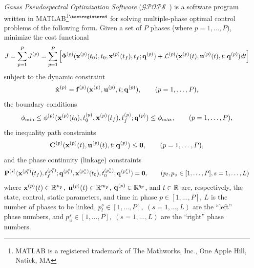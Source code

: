 \documentclass[10pt,final]{report}
\newcommand{\gpops}{$\mathcal{GPOPS}$~}
\begin{document}
{\em Gauss Pseudospectral Optimization Software}
(\gpops) is a software program written in MATLAB\footnote{MATLAB is a
  registered trademark of The Mathworks, Inc., One Apple Hill, Natick,
  MA}${}^{\textregistered}$ for solving multiple-phase optimal control
problems of the following form.  Given a set of $P$ phases (where
$p=1,\ldots,P$), minimize the cost functional
\begin{equation}
  J = \sum_{p=1}^{P} J^{(p)} = \sum_{p=1}^{P}
  \left[\Phi^{(p)}(\bfx^{(p)}(t_0),t_0,\bfx^{(p)}(t_f),t_f;\bfq^{(p)})
  + \mcL^{(p)}(\bfx^{(p)}(t),\bfu^{(p)}(t),t;\bfq^{(p)})dt \right]
\end{equation}
subject to the dynamic constraint
\begin{equation}
  \dbfx^{(p)} = \bff^{(p)}(\bfx^{(p)},\bfu^{(p)},t;\bfq^{(p)}), \qquad (p=1,\ldots,P),
\end{equation}
the boundary conditions
\begin{equation}
  \bfphi_{\min} \leq
  \bfphi^{(p)}(\bfx^{(p)}(t_0),t_0^{(p)},\bfx^{(p)}(t_f),t_f^{(p)};\bfq^{(p)})
  \leq \bfphi_{\max}, \qquad (p=1,\ldots,P),
\end{equation}
the inequality path constraints
\begin{equation}
  \bfC^{(p)}(\bfx^{(p)}(t),\bfu^{(p)}(t),t;\bfq^{(p)})\leq  \bfzero, \qquad
  (p=1,\ldots,P),
\end{equation}
and the phase continuity (linkage) constraints
\begin{equation}
  \bfP^{(s)}(\bfx^{(p_l^s)}(t_f),t_f^{(p_l^s)};\bfq^{(p_l^s)},\bfx^{(p_u^s)}(t_0),t_0^{(p_u^s)};\bfq^{(p_u^s)})
  =   \bfzero, \qquad (p_l,p_u\in[1,\ldots,P],s=1,\ldots,L)
\end{equation}
where $\bfx^{(p)}(t)\in\bbR^{n_p}$, $\bfu^{(p)}(t)\in\bbR^{m_p}$,
$\bfq^{(p)}\in\bbR^{q_p}$, and $t\in\bbR$ are, respectively, the state,
control, static parameters, and time in phase $p\in[1,\ldots,P]$, $L$
is the number of phases to be linked,
$p_l^s\in[1,\ldots,P],\;(s=1,\ldots,L)$ are the ``left'' phase numbers,
and $p_u^s\in[1,\ldots,P],\;(s=1,\ldots,L)$ are the ``right'' phase
numbers.
\end{document}
